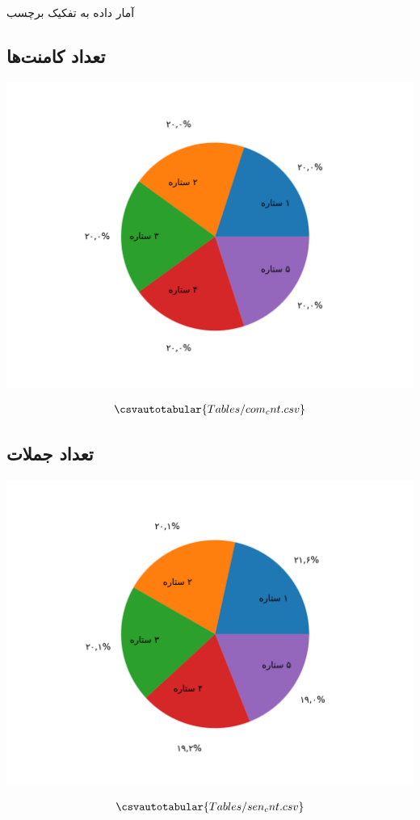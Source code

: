 \Section
{آمار داده به تفکیک برچسب}
{
\subsection{تعداد کامنت‌ها}
{
}
\begin{center}
\includegraphics[scale=0.75]{Images/com_cnt.png}
\end{center}
\begin{align*}
  \csvautotabular{Tables/com_cnt.csv}  
\end{align*}
\newpage
\subsection{تعداد جملات}
{
\begin{center}
\includegraphics[scale=0.75]{Images/sen_cnt.png}
\end{center}
\begin{align*}
  \csvautotabular{Tables/sen_cnt.csv}  
\end{align*}
}
\newpage
}

